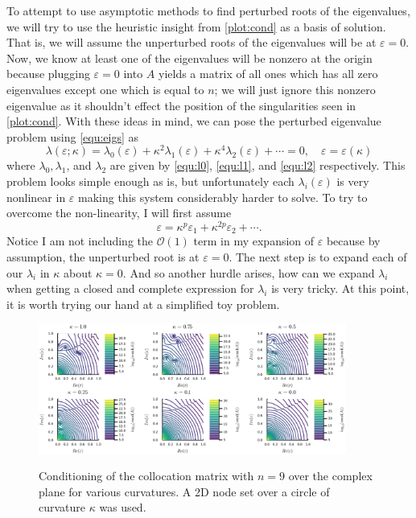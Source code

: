 \documentclass[a4paper,11pt]{article}
\newcommand{\eps}{\varepsilon}
\newcommand{\bigO}{\mathcal{O}}
\begin{document}
To attempt to use asymptotic methods to find perturbed roots of the eigenvalues, we will try to use the heuristic insight from \autoref{plot:cond} as a basis of solution. That is, we will assume the unperturbed roots of the eigenvalues will be at $ \eps = 0 $. Now, we know at least one of the eigenvalues will be nonzero at the origin because plugging $ \eps = 0 $ into $ A $ yields a matrix of all ones which has all zero eigenvalues except one which is equal to $ n $; we will just ignore this nonzero eigenvalue as it shouldn't effect the position of the singularities seen in \autoref{plot:cond}. With these ideas in mind, we can pose the perturbed eigenvalue problem using \eqref{equ:eigs} as
\[
	\lambda(\eps; \kappa) = \lambda_0(\eps) + \kappa^2 \lambda_1(\eps) + \kappa^4 \lambda_2(\eps) + \cdots = 0, \quad \eps = \eps(\kappa)
\]
where $ \lambda_0, \lambda_1 $, and $ \lambda_2 $ are given by \eqref{equ:l0}, \eqref{equ:l1}, and \eqref{equ:l2} respectively. This problem looks simple enough as is, but unfortunately each $ \lambda_i(\eps) $ is very nonlinear in $ \eps $ making this system considerably harder to solve. To try to overcome the non-linearity, I will first assume
\[
	\eps = \kappa^p \eps_1 + \kappa^{2p} \eps_2 + \cdots.
\]
Notice I am not including the $ \bigO(1) $ term in my expansion of $ \eps $ because by assumption, the unperturbed root is at $ \eps = 0 $. The next step is to expand each of our $ \lambda_i $ in $ \kappa $ about $ \kappa = 0 $. And so another hurdle arises, how can we expand $ \lambda_i $ when getting a closed and complete expression for $ \lambda_i $ is very tricky. At this point, it is worth trying our hand at a simplified toy problem. 

\begin{figure}[t]
	\centering
	\captionsetup{width = 0.9\textwidth}
	\caption{Conditioning of the collocation matrix with $ n = 9 $ over the complex plane for various curvatures. A 2D node set over a circle of curvature $ \kappa $ was used.}
	\includegraphics[width = 0.9\textwidth]{Images/Conditioning.png}
	\label{plot:cond}
\end{figure}
\end{document}

